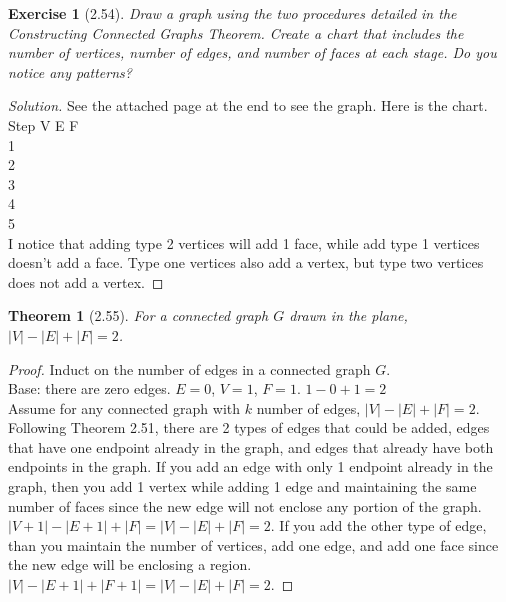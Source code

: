 \documentclass{article}
\newtheorem*{thm}{Theorem}
\newtheorem*{ex}{Exercise}
\newenvironment{solution}
  {\begin{proof}[Solution]}
  {\renewcommand{\qedsymbol}{}\end{proof}}
\begin{document}
\begin{ex}[2.54]
	Draw a graph using the two procedures detailed in the Constructing Connected Graphs Theorem. Create a chart that includes the number of vertices, number of edges, and number of faces at each stage. Do you notice any patterns?
\end{ex}
\begin{solution} See the attached page at the end to see the graph. Here is the chart.\\
	Step \quad V \quad E \quad F \\
	1 \quad {} \quad {} \quad {} \\
	2 \quad {} \quad {} \quad {} \\
	3 \quad {} \quad {} \quad {} \\
	4 \quad {} \quad {} \quad {} \\
	5 \quad {} \quad {} \quad {} \\

	I notice that adding type 2 vertices will add 1 face, while add type 1 vertices doesn't add a face. Type one vertices also add a vertex, but type two vertices does not add a vertex. 
\end{solution}

\begin{thm}[2.55]
	For a connected graph $G$ drawn in the plane, $|V| - |E| + |F| = 2$.
\end{thm}
\begin{proof}
	Induct on the number of edges in a connected graph $G$. \\Base: there are zero edges. $E = 0$, $V = 1$, $F = 1$. $ 1 - 0 + 1 = 2$ \\ Assume for any connected graph with $k$ number of edges, $|V| - |E| + |F| = 2$. 
	Following Theorem 2.51, there are 2 types of edges that could be added, edges that have one endpoint already in the graph, and edges that already have both endpoints in the graph. If you add an edge with only 1 endpoint
	already in the graph, then you add 1 vertex while adding 1 edge and maintaining the same number of faces since the new edge will not enclose any portion of the graph. $|V + 1| - |E + 1| + |F| = |V| - |E| + |F| = 2$.
	If you add the other type of edge, than you maintain the number of vertices, add one edge, and add one face since the new edge will be enclosing a region. $|V| - |E + 1| + |F + 1| = |V| - |E| + |F| = 2$. 
\end{proof}
\end{document}
